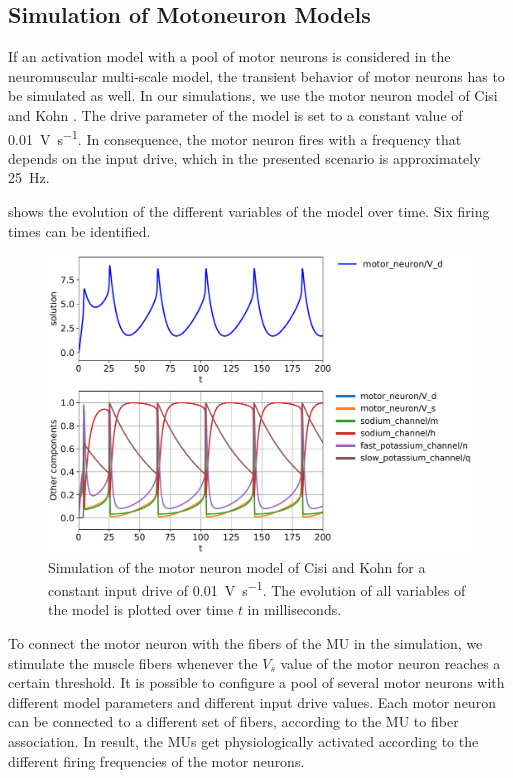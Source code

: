 \subsection{Simulation of Motoneuron Models}

If an activation model with a pool of motor neurons is considered in the neuromuscular multi-scale model, the transient behavior of motor neurons has to be simulated as well. In our simulations, we use the motor neuron model of Cisi and Kohn \cite{Cisi2008}. The drive parameter of the model is set to a constant value of \SI{0.01}{\volt\per\second}. In consequence, the motor neuron fires with a frequency that depends on the input drive, which in the presented scenario is approximately \SI{25}{\hertz}.

 shows the evolution of the different variables of the model over time. Six firing times can be identified. 

\begin{figure}
  \centering%
  \includegraphics[width=\textwidth]{images/results/basic/motoneuron_plot.pdf}%
  \caption{Simulation of the motor neuron model of Cisi and Kohn \cite{Cisi2008} for a constant input drive of  \SI{0.01}{\volt\per\second}. The evolution of all variables of the model is plotted over time $t$ in milliseconds.}%
  \label{fig:motoneuron_plot}%
\end{figure}%

To connect the motor neuron with the fibers of the MU in the simulation, we stimulate the muscle fibers whenever the $V_s$ value of the motor neuron reaches a certain threshold. It is possible to configure a pool of several motor neurons with different model parameters and different input drive values. Each motor neuron can be connected to a different set of fibers, according to the MU to fiber association. In result, the MUs get physiologically activated according to the different firing frequencies of the motor neurons.

